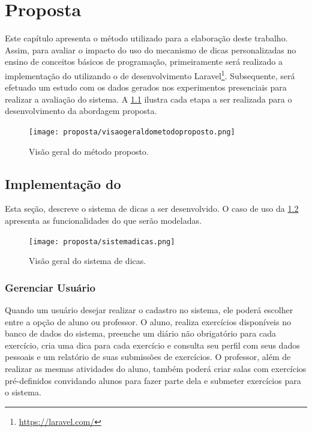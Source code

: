 \chapter{Proposta}

Este capítulo apresenta o método utilizado para a elaboração deste trabalho. Assim, para avaliar o impacto do uso do mecanismo de dicas personalizadas no ensino de conceitos básicos de programação, primeiramente será realizado a implementação do  utilizando o  de desenvolvimento Laravel\footnote{\url{https://laravel.com/}}. Subsequente, será efetuado um estudo com os dados gerados nos experimentos presenciais para realizar a avaliação do sistema. A \cref{figura:visaometodo} ilustra cada etapa a ser realizada para o desenvolvimento da abordagem proposta.

\begin{figure}[h]
	\captionsetup{justification=centering}
	\texttt{[image: proposta/visaogeraldometodoproposto.png]}
	\caption{Visão geral do método proposto.}
	\label{figura:visaometodo}
\end{figure}

\section{Implementação do }

Esta seção, descreve o sistema de dicas a ser desenvolvido. O caso de uso da \cref{figura:sistemadicas} apresenta as funcionalidades do  que serão modeladas.

\begin{figure}[h]
	\centering
	\captionsetup{justification=centering}
	\texttt{[image: proposta/sistemadicas.png]}
	\caption{Visão geral do sistema de dicas.}
	\label{figura:sistemadicas}
\end{figure}

\subsection{Gerenciar Usuário}

Quando um usuário desejar realizar o cadastro no sistema, ele poderá escolher entre a opção de aluno ou professor. O aluno, realiza exercícios disponíveis no banco de dados do sistema, preenche um diário não obrigatório para cada exercício, cria uma dica para cada exercício e consulta seu perfil com seus dados pessoais e um relatório de suas submissões de exercícios. O professor, além de realizar as mesmas atividades do aluno, também poderá criar salas com exercícios pré-definidos convidando alunos para fazer parte dela e submeter exercícios para o sistema. 

